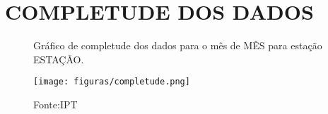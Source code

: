 \section{COMPLETUDE DOS DADOS}

\label{fig:completude}
\begin{figure}[htb!]
    \centering
	\captionsetup{justification=raggedright, singlelinecheck=false, width=1\textwidth}
    \caption{Gráfico de completude dos dados para o mês de MÊS para estação ESTAÇÃO.}
    \texttt{[image: figuras/completude.png]} %
    \caption*{Fonte:IPT}
\end{figure}

